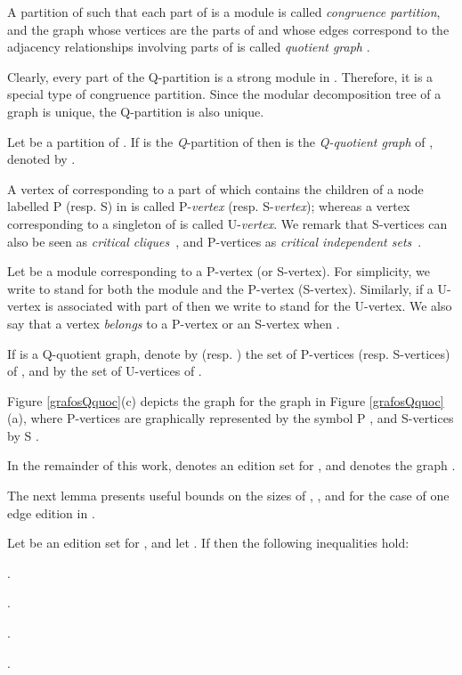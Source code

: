 \documentclass[12pt]{article}
\begin{document}
A partition  of  such that each part of  is a
module is called \emph{congruence partition}, and the graph whose
vertices are the parts of  and whose edges correspond to the
adjacency relationships involving parts of  is called
\emph{quotient graph} .

Clearly, every part of the Q-partition is a strong module in .
Therefore, it is a special type of congruence partition. Since the
modular decomposition tree of a graph is unique, the Q-partition
is also unique.

\begin{defin}
Let  be a partition of . If  is the
\emph{Q}-partition of  then  is the \emph{Q-quotient
graph} of , denoted by .
\end{defin}

A vertex of  corresponding to a part of  which
contains the children of a node labelled P (resp. S) in  is
called P-\emph{vertex} (resp. S-\emph{vertex}); whereas a vertex
corresponding to a singleton  of  is called
U-\emph{vertex}. We remark that S-vertices can also be seen as
{\em critical cliques}~\cite{G2007}, and P-vertices as {\em
critical independent sets}~\cite{YZ2007}.

Let  be a module corresponding to a P-vertex (or S-vertex).
For simplicity, we write  to stand for both the
module and the P-vertex (S-vertex). Similarly, if a U-vertex is associated with
part   of  then we write  to stand
for the U-vertex. We also say that a vertex   {\em
belongs} to a P-vertex or an S-vertex  when
.

If  is a Q-quotient graph, denote by  (resp.
) the set of P-vertices (resp. S-vertices) of
, and by  the set of U-vertices of .

Figure \ref{grafosQquoc}(c) depicts the graph  for
the graph  in Figure \ref{grafosQquoc}(a), where P-vertices are
graphically represented by the symbol
\mbox{\hspace{-.105in}\scriptsize{P}} \normalsize, and
S-vertices by \mbox{\hspace{-.10in}\scriptsize{S}}
\normalsize.

In the remainder of this work,  denotes an edition set for , and  denotes the graph .

The next lemma presents useful bounds on the sizes of ,
,  and 
for the case of one edge edition in .

\begin{lema} \label{1edicao-quociente}
Let  be an edition set for , and let .
If  then the following inequalities hold:

 .

 .

 .

 .
\end{lema}
\end{document}
